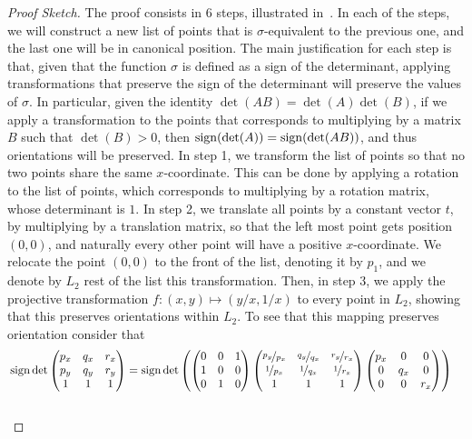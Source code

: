 
\begin{proof}[Proof Sketch]
The proof consists in 6 steps, illustrated in~. In each of the steps, we will construct a new list of points that is $\sigma$-equivalent to the previous one, and the last one will be in canonical position.
The main justification for each step is that, given that the function $\sigma$ is defined as a sign of the determinant, applying transformations that preserve the sign of the determinant will preserve the values of $\sigma$. In particular, given the identity $\det(AB) = \det(A)\det(B)$, if we apply a transformation to the points that corresponds to multiplying by a matrix $B$ such that $\det(B) > 0$, then $\operatorname{sign}(\det(A)) = \operatorname{sign}(\det(AB))$, and thus orientations will be preserved.
In step 1, we transform the list of points so that no two points share the same $x$-coordinate. This can be done by applying a rotation to the list of points, which corresponds to multiplying by a rotation matrix, whose determinant is $1$. 
In step 2, we translate all points by a constant vector $t$, by multiplying by a translation matrix, so that the left most point gets position $(0, 0)$, and naturally every other point will have a positive $x$-coordinate. We relocate the point $(0,0)$ to the front of the list, denoting it by $p_1$, and we denote by $L_2$ rest of the list this transformation.
Then, in step 3, we  apply the projective transformation $f: (x, y) \mapsto (y/x, 1/x)$ to every point in $L_2$, showing that this preserves orientations within $L_2$.
To see that this mapping preserves orientation consider that 
\[
\begin{multlined}
 \sign \det \begin{pmatrix} p_x & q_x & r_x \\ p_y & q_y & r_y \\ 1 & 1 & 1 \end{pmatrix} =  \sign \det \left( \begin{pmatrix} 0 & 0 & 1 \\ 1 & 0 & 0\\ 0 & 1 & 0 \end{pmatrix}  \begin{pmatrix} \nicefrac{p_y}{p_x} & \nicefrac{q_y}{q_x} & \nicefrac{r_y}{r_x} \\ \nicefrac{1}{p_x} & \nicefrac{1}{q_x} & \nicefrac{1}{r_x} \\ 1 & 1 & 1 \end{pmatrix}  \begin{pmatrix} p_x & 0 & 0 \\ 0 & q_x & 0\\ 0 & 0 & r_x \end{pmatrix} \right)\\

\end{multlined}\]
\end{proof}
